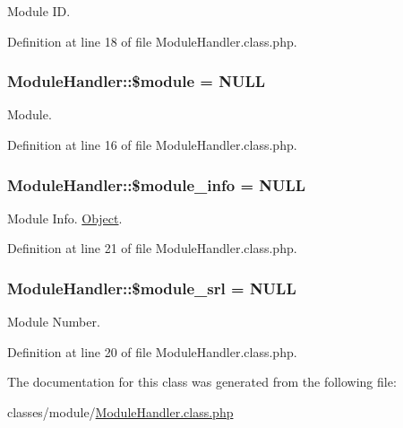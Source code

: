 Module I\+D. 



Definition at line 18 of file Module\+Handler.\+class.\+php.

\hypertarget{classModuleHandler_a24f28ac6c101582f043bef672a9f3b00}{
\subsubsection[{\$module}]{\setlength{\rightskip}{0pt plus 5cm}Module\+Handler\+::\$module = N\+U\+L\+L}}\label{classModuleHandler_a24f28ac6c101582f043bef672a9f3b00}


Module. 



Definition at line 16 of file Module\+Handler.\+class.\+php.

\hypertarget{classModuleHandler_a2388e5ef665a5a82efa00c8c894df33c}{
\subsubsection[{\$module\+\_\+info}]{\setlength{\rightskip}{0pt plus 5cm}Module\+Handler\+::\$module\+\_\+info = N\+U\+L\+L}}\label{classModuleHandler_a2388e5ef665a5a82efa00c8c894df33c}


Module Info. \hyperlink{classObject}{Object}. 



Definition at line 21 of file Module\+Handler.\+class.\+php.

\hypertarget{classModuleHandler_ad79751537e64d7bfc7dc6fa4280043b0}{
\subsubsection[{\$module\+\_\+srl}]{\setlength{\rightskip}{0pt plus 5cm}Module\+Handler\+::\$module\+\_\+srl = N\+U\+L\+L}}\label{classModuleHandler_ad79751537e64d7bfc7dc6fa4280043b0}


Module Number. 



Definition at line 20 of file Module\+Handler.\+class.\+php.



The documentation for this class was generated from the following file\+:\begin{DoxyCompactItemize}
\item 
classes/module/\hyperlink{ModuleHandler_8class_8php}{Module\+Handler.\+class.\+php}\end{DoxyCompactItemize}
